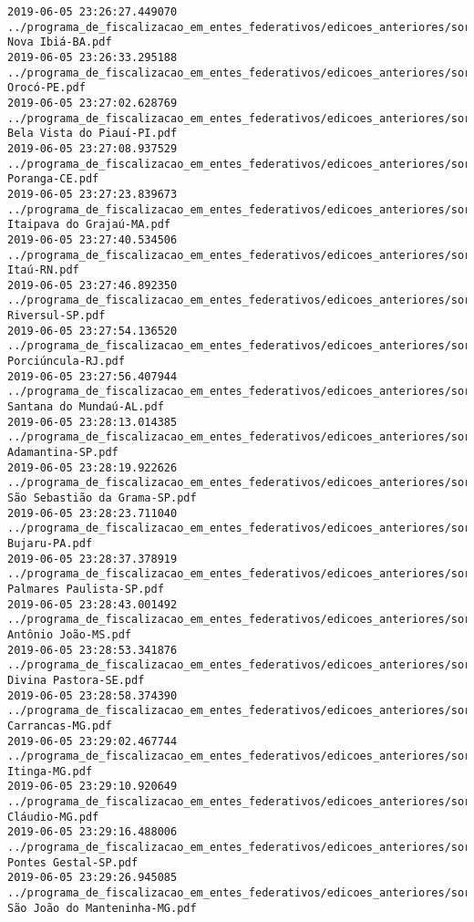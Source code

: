 \begin{lstlisting}
2019-06-05 23:26:27.449070 ../programa_de_fiscalizacao_em_entes_federativos/edicoes_anteriores/sorteio_35/1888-Nova Ibiá-BA.pdf
2019-06-05 23:26:33.295188 ../programa_de_fiscalizacao_em_entes_federativos/edicoes_anteriores/sorteio_35/1917-Orocó-PE.pdf
2019-06-05 23:27:02.628769 ../programa_de_fiscalizacao_em_entes_federativos/edicoes_anteriores/sorteio_35/1919-Bela Vista do Piauí-PI.pdf
2019-06-05 23:27:08.937529 ../programa_de_fiscalizacao_em_entes_federativos/edicoes_anteriores/sorteio_35/1894-Poranga-CE.pdf
2019-06-05 23:27:23.839673 ../programa_de_fiscalizacao_em_entes_federativos/edicoes_anteriores/sorteio_35/1900-Itaipava do Grajaú-MA.pdf
2019-06-05 23:27:40.534506 ../programa_de_fiscalizacao_em_entes_federativos/edicoes_anteriores/sorteio_35/1925-Itaú-RN.pdf
2019-06-05 23:27:46.892350 ../programa_de_fiscalizacao_em_entes_federativos/edicoes_anteriores/sorteio_35/1942-Riversul-SP.pdf
2019-06-05 23:27:54.136520 ../programa_de_fiscalizacao_em_entes_federativos/edicoes_anteriores/sorteio_35/1924-Porciúncula-RJ.pdf
2019-06-05 23:27:56.407944 ../programa_de_fiscalizacao_em_entes_federativos/edicoes_anteriores/sorteio_35/1885-Santana do Mundaú-AL.pdf
2019-06-05 23:28:13.014385 ../programa_de_fiscalizacao_em_entes_federativos/edicoes_anteriores/sorteio_35/1938-Adamantina-SP.pdf
2019-06-05 23:28:19.922626 ../programa_de_fiscalizacao_em_entes_federativos/edicoes_anteriores/sorteio_35/1943-São Sebastião da Grama-SP.pdf
2019-06-05 23:28:23.711040 ../programa_de_fiscalizacao_em_entes_federativos/edicoes_anteriores/sorteio_35/1911-Bujaru-PA.pdf
2019-06-05 23:28:37.378919 ../programa_de_fiscalizacao_em_entes_federativos/edicoes_anteriores/sorteio_35/1940-Palmares Paulista-SP.pdf
2019-06-05 23:28:43.001492 ../programa_de_fiscalizacao_em_entes_federativos/edicoes_anteriores/sorteio_35/1908-Antônio João-MS.pdf
2019-06-05 23:28:53.341876 ../programa_de_fiscalizacao_em_entes_federativos/edicoes_anteriores/sorteio_35/1936-Divina Pastora-SE.pdf
2019-06-05 23:28:58.374390 ../programa_de_fiscalizacao_em_entes_federativos/edicoes_anteriores/sorteio_35/1901-Carrancas-MG.pdf
2019-06-05 23:29:02.467744 ../programa_de_fiscalizacao_em_entes_federativos/edicoes_anteriores/sorteio_35/1904-Itinga-MG.pdf
2019-06-05 23:29:10.920649 ../programa_de_fiscalizacao_em_entes_federativos/edicoes_anteriores/sorteio_35/1902-Cláudio-MG.pdf
2019-06-05 23:29:16.488006 ../programa_de_fiscalizacao_em_entes_federativos/edicoes_anteriores/sorteio_35/1941-Pontes Gestal-SP.pdf
2019-06-05 23:29:26.945085 ../programa_de_fiscalizacao_em_entes_federativos/edicoes_anteriores/sorteio_35/1907-São João do Manteninha-MG.pdf

\end{lstlisting}
